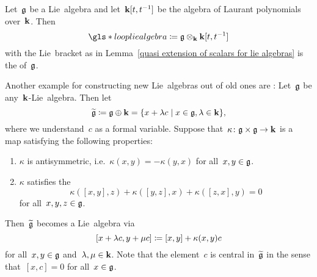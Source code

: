 \begin{definition}
  Let~$\mathfrak{g}$ be a Lie~algebra and let~$\mathbf{k}[t, t^{-1}]$ be the algebra of Laurant polynomials over~$\kf$.
  Then
  \[
    \gls*{loop lie algebra}
    \defined
    \glie \tensor_\kf \kf[t, t^{-1}]
  \]
  with the Lie~bracket as in Lemma~\ref{quasi extension of scalars for lie algebras} is the  of~$\mathfrak{g}$.
\end{definition}
 
 
\begin{example}
  Another example for constructing new Lie~algebras out of old ones are :
  Let~$\mathfrak{g}$ be any~$\kf$-Lie~algebra.
  Then let
  \[
    \widetilde{\glie}
    \defined
    \glie \oplus \kf
    =
    \{
      x + \lambda c
    \suchthat
      x \in \glie,
      \lambda \in \kf
    \},
  \]
  where we understand~$c$ as a formal variable.
  Suppose that~$\kappa \colon \mathfrak{g} \times \mathfrak{g} \to \mathbf{k}$ is a~{\bilinear{$\kf$}} map satisfying the following properties:
  \begin{enumerate}
  \item
    $\kappa$ is antisymmetric, i.e.~$\kappa(x,y) = -\kappa(y,x)$ for all~$x,y \in \mathfrak{g}$.
  \item
    $\kappa$ satisfies the 
    \[
      \kappa([x,y],z) + \kappa([y,z],x) + \kappa([z,x],y) = 0
    \]
    for all~$x, y, z \in \mathfrak{g}$.
  \end{enumerate}
  Then~$\widetilde{\mathfrak{g}}$ becomes a Lie~algebra via
  \[
    [x + \lambda c, y + \mu c]
    \coloneqq
    [x,y] + \kappa(x,y) c
  \]
  for all~$x, y \in \mathfrak{g}$ and~$\lambda, \mu \in \mathbf{k}$.
  Note that the element~$c$ is central in~$\widetilde{\mathfrak{g}}$ in the sense that~$[x,c] = 0$ for all~$x \in \mathfrak{g}$.
  

\end{example}
